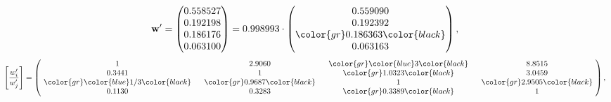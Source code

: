\begin{example}
\begin{equation*}
\mathbf{w}^{\prime} =
\begin{pmatrix}
0.558527\\
0.192198\\
0.186176\\
0.063100
\end{pmatrix} =
0.998993\cdot
\begin{pmatrix}
0.559090\\
0.192392\\
\color{gr} 0.186363\color{black} \\
0.063163
\end{pmatrix},
\end{equation*}
\begin{equation*}
\left[ \frac{{w}^{\prime}_i}{{w}^{\prime}_j} \right] =
\begin{pmatrix}
$\,\,$ 1 $\,\,$ & $\,\,$2.9060$\,\,$ & $\,\,$\color{gr} \color{blue} 3\color{black} $\,\,$ & $\,\,$8.8515$\,\,$ \\
$\,\,$0.3441$\,\,$ & $\,\,$ 1 $\,\,$ & $\,\,$\color{gr} 1.0323\color{black} $\,\,$ & $\,\,$3.0459  $\,\,$ \\
$\,\,$\color{gr} \color{blue}  1/3\color{black} $\,\,$ & $\,\,$\color{gr} 0.9687\color{black} $\,\,$ & $\,\,$ 1 $\,\,$ & $\,\,$\color{gr} 2.9505\color{black}  $\,\,$ \\
$\,\,$0.1130$\,\,$ & $\,\,$0.3283$\,\,$ & $\,\,$\color{gr} 0.3389\color{black} $\,\,$ & $\,\,$ 1  $\,\,$ \\
\end{pmatrix},
\end{equation*}
\end{example}
\newpage
